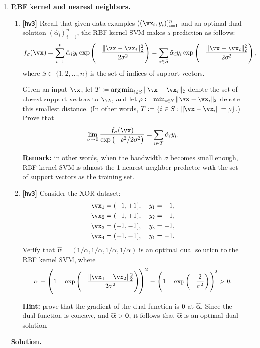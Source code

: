 \documentclass{article}
\def\balpha{\boldsymbol{\alpha}}
\DeclareMathOperator*{\argmin}{arg\,min}
\def\hw{\textbf{[\texttt{hw3}]}\xspace}
\theoremstyle{definition}
\theoremstyle{remark}
\newenvironment{Q}
{%
\clearpage
\item
}
{%
\phantom{s}%
\bigskip%
\noindent\textbf{Solution.}
}
\begin{document}
\begin{enumerate}[font={\Large\bfseries},leftmargin=0pt]
\begin{Q}
    \textbf{RBF kernel and nearest neighbors.}
    \begin{enumerate}
        \item \hw Recall that given data examples $((\vx_i,y_i))_{i=1}^n$ and an optimal dual solution $(\hat{\alpha}_i)_{i=1}^n$, the RBF kernel SVM makes a prediction as follows:
        \begin{align*}
            f_{\sigma}(\vx)=\sum_{i=1}^{n}\hat{\alpha}_iy_i\exp\del{-\frac{\|\vx-\vx_i\|_2^2}{2\sigma^2}}=\sum_{i\in S}^{}\hat{\alpha}_iy_i\exp\del{-\frac{\|\vx-\vx_i\|_2^2}{2\sigma^2}},
        \end{align*}
        where $S\subset\{1,2,\ldots,n\}$ is the set of indices of support vectors.

        Given an input $\vx$, let $T:=\argmin_{i\in S}\|\vx-\vx_i\|_2$ denote the set of closest support vectors to $\vx$, and let $\rho:=\min_{i\in S}\|\vx-\vx_i\|_2$ denote this smallest distance.  (In other words, $T := \{ i \in S : \|\vx-\vx_i\| = \rho \}$.) Prove that
        \begin{align*}
            \lim_{\sigma\to0}\frac{f_{\sigma}(\vx)}{\exp\del{-\rho^2/2\sigma^2}}=\sum_{i\in T}^{}\hat{\alpha}_iy_i.
        \end{align*}

        \textbf{Remark:} in other words, when the bandwidth $\sigma$ becomes small enough, RBF kernel SVM is almost the 1-nearest neighbor predictor with the set of support vectors as the training set.

        \item \hw Consider the XOR dataset:
        \begin{align*}
            \vx_1=(+1,+1),\quad y_1=+1, \\
            \vx_2=(-1,+1),\quad y_2=-1, \\
            \vx_3=(-1,-1),\quad y_3=+1, \\
            \vx_4=(+1,-1),\quad y_4=-1.
        \end{align*}
        Verify that $\hat{\balpha}=(1/\alpha,1/\alpha,1/\alpha,1/\alpha)$ is an optimal dual solution to the RBF kernel SVM, where
        \begin{align*}
            \alpha=\del{1-\exp\del{-\frac{\|\vx_1-\vx_2\|_2^2}{2\sigma^2}}}^2=\del{1-\exp\del{-\frac{2}{\sigma^2}}}^2>0.
        \end{align*}

        \textbf{Hint:} prove that the gradient of the dual function is $\boldsymbol{0}$ at $\hat{\balpha}$. Since the dual function is concave, and $\hat{\balpha}>\boldsymbol{0}$, it follows that $\hat{\balpha}$ is an optimal dual solution.


\end{enumerate}
\end{Q}
\end{enumerate}
\end{document}
